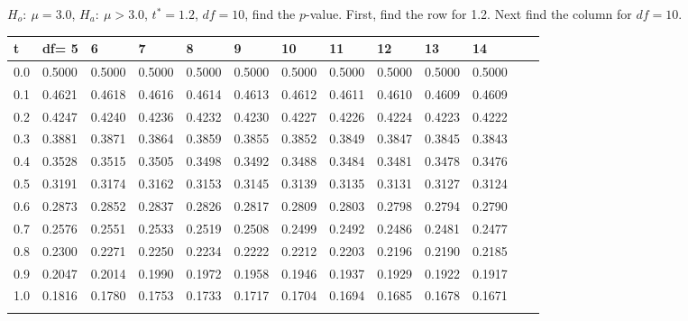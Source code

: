 \begin{frame}{\small $H_o:~\mu=3.0$, $H_a:~\mu>3.0$, $t^*=1.2$,
    $df=10$, find the $p$-value.}
{\small First, find the row for 1.2. Next find the column for $df=10$.}    
  {
\fontsize{5pt}{5pt}
\selectfont

\begin{tabular}{l|lllll>{\columncolor{light-blue}}lllllll} 
t  & df= 5  &  6  &  7  &  8  &  9  &  10  &  11  &  12  &  13  &  14    \\\hline 
 0.0 & 0.5000 & 0.5000 & 0.5000 & 0.5000 & 0.5000 & 0.5000 & 0.5000 & 0.5000 & 0.5000 & 0.5000  \\[5pt] \arrayrulecolor{light-gray}\hline\arrayrulecolor{black}  
 0.1 & 0.4621 & 0.4618 & 0.4616 & 0.4614 & 0.4613 & 0.4612 & 0.4611 & 0.4610 & 0.4609 & 0.4609  \\[5pt] \arrayrulecolor{light-gray}\hline\arrayrulecolor{black}  
 0.2 & 0.4247 & 0.4240 & 0.4236 & 0.4232 & 0.4230 & 0.4227 & 0.4226 & 0.4224 & 0.4223 & 0.4222  \\[5pt] \arrayrulecolor{light-gray}\hline\arrayrulecolor{black}  
 0.3 & 0.3881 & 0.3871 & 0.3864 & 0.3859 & 0.3855 & 0.3852 & 0.3849 & 0.3847 & 0.3845 & 0.3843  \\[5pt] \arrayrulecolor{light-gray}\hline\arrayrulecolor{black}  
 0.4 & 0.3528 & 0.3515 & 0.3505 & 0.3498 & 0.3492 & 0.3488 & 0.3484 & 0.3481 & 0.3478 & 0.3476  \\[5pt] \arrayrulecolor{light-gray}\hline\arrayrulecolor{black}  
 0.5 & 0.3191 & 0.3174 & 0.3162 & 0.3153 & 0.3145 & 0.3139 & 0.3135 & 0.3131 & 0.3127 & 0.3124  \\[5pt] \arrayrulecolor{light-gray}\hline\arrayrulecolor{black}  
 0.6 & 0.2873 & 0.2852 & 0.2837 & 0.2826 & 0.2817 & 0.2809 & 0.2803 & 0.2798 & 0.2794 & 0.2790  \\[5pt] \arrayrulecolor{light-gray}\hline\arrayrulecolor{black}  
 0.7 & 0.2576 & 0.2551 & 0.2533 & 0.2519 & 0.2508 & 0.2499 & 0.2492 & 0.2486 & 0.2481 & 0.2477  \\[5pt] \arrayrulecolor{light-gray}\hline\arrayrulecolor{black}  
 0.8 & 0.2300 & 0.2271 & 0.2250 & 0.2234 & 0.2222 & 0.2212 & 0.2203 & 0.2196 & 0.2190 & 0.2185  \\[5pt] \arrayrulecolor{light-gray}\hline\arrayrulecolor{black}  
 0.9 & 0.2047 & 0.2014 & 0.1990 & 0.1972 & 0.1958 & 0.1946 & 0.1937 & 0.1929 & 0.1922 & 0.1917  \\[5pt] \arrayrulecolor{light-gray}\hline\arrayrulecolor{black}  
 1.0 & 0.1816 & 0.1780 & 0.1753 & 0.1733 & 0.1717 & 0.1704 & 0.1694 & 0.1685 & 0.1678 & 0.1671  \\[5pt] \arrayrulecolor{light-gray}\hline\arrayrulecolor{black}  

\end{tabular}}
\end{frame}

